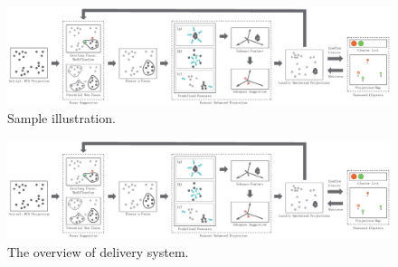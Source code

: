 \ifx
\begin{figure}[htb]
\centering
\includegraphics{images/Pipeline.eps}
\caption{Sample illustration.}
\end{figure}
\else
\begin{figure}[htbp]
\centering
  \includegraphics[width=1\linewidth]{images/Pipeline.eps}%
  \caption{The overview of delivery system.}\label{fig.2}
  \end{figure}
  \fi